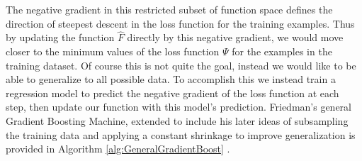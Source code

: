 \documentclass[9pt, conference]{IEEEtran}
\begin{document}
The negative gradient in this restricted subset of function space defines the direction of steepest descent in the loss function for the training examples. Thus by updating the function \(\hat{F}\) directly by this negative gradient, we would move closer to the minimum values of the loss function \(\Psi\) for the examples in the training dataset. Of course this is not quite the goal, instead we would like to be able to generalize to all possible data. To accomplish this we instead train a regression model to predict the negative gradient of the loss function at each step, then update our function with this model's prediction. Friedman's general Gradient Boosting Machine, extended to include his later ideas of subsampling the training data and applying a constant shrinkage to improve generalization is provided in Algorithm \ref{alg:GeneralGradientBoost} \cite{2012ridgeway} \cite{2001Friedman} \cite{2002Friedman}. 
\end{document}
